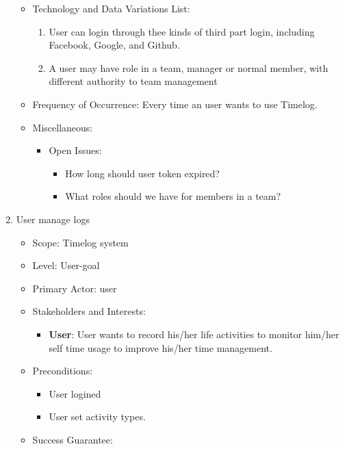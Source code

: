 \documentclass[12pt, a4paper]{article}
\begin{document}
\begin{CJK*}{UTF8}{bkai}
\begin{enumerate}
\begin{itemize}
\begin{enumerate}
            \end{enumerate}
          \item Technology and Data Variations List:
            \begin{enumerate}
              \item User can login through thee kinds of third part login, including Facebook, Google, and Github.
              \item A user may have role in a team, manager or normal member, with different authority to team management
            \end{enumerate}
          \item Frequency of Occurrence: Every time an user wants to use Timelog.
          \item Miscellaneous:
            \begin{itemize}
              \item Open Issues:
                \begin{itemize}
                  \item How long should user token expired?
                  \item What roles should we have for members in a team?
                \end{itemize}
            \end{itemize}
        \end{itemize}
      \item User manage logs
        \begin{itemize}
          \item Scope: Timelog system
          \item Level: User-goal
          \item Primary Actor: user
          \item Stakeholders and Interests:
            \begin{itemize}
              \item {\bf User}: User wants to record his/her life activities to monitor him/her self time usage to improve his/her time management.
            \end{itemize}
          \item Preconditions:
            \begin{itemize}
              \item User logined
              \item User set activity types.
            \end{itemize}
          \item Success Guarantee:

\end{itemize}
\end{enumerate}
\end{CJK*}
\end{document}
